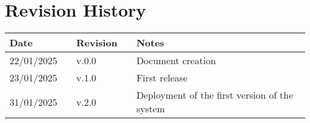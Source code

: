 \chapter*{Revision History}

\begin{table}[h]
    \centering
    \begin{tabular}{l p{.5cm} l p{1cm} l}
        \hline
        \textbf{Date} &  & \textbf{Revision} &  & \textbf{Notes}                                \\ \hline
        22/01/2025    &  & v.0.0             &  & Document creation                             \\
        23/01/2025    &  & v.1.0             &  & First release                                 \\
        31/01/2025    &  & v.2.0             &  & Deployment of the first version of the system \\\hline
    \end{tabular}
\end{table}

\newpage